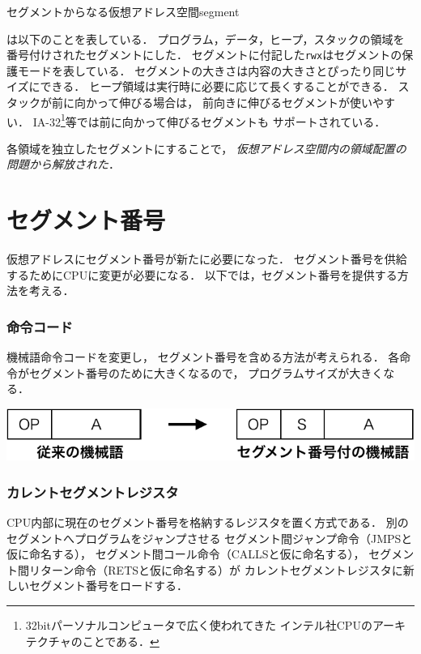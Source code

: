 {セグメントからなる仮想アドレス空間}{segment}

は以下のことを表している．
プログラム，データ，ヒープ，スタックの領域を番号付けされたセグメントにした．
セグメントに付記した\texttt{rwx}はセグメントの保護モードを表している．
セグメントの大きさは内容の大きさとぴったり同じサイズにできる．
ヒープ領域は実行時に必要に応じて長くすることができる．
スタックが前に向かって伸びる場合は，
前向きに伸びるセグメントが使いやすい．
IA-32\footnote{
32bitパーソナルコンピュータで広く使われてきた
インテル社CPUのアーキテクチャのことである．
}等では前に向かって伸びるセグメントも
サポートされている\cite{ia32Segmentation}．

各領域を独立したセグメントにすることで，
\emph{仮想アドレス空間内の領域配置の問題から解放された}．

\section{セグメント番号}
仮想アドレスにセグメント番号が新たに必要になった．
セグメント番号を供給するためにCPUに変更が必要になる．
以下では，セグメント番号を提供する方法を考える．

\subsubsection{命令コード}
機械語命令コードを変更し，
セグメント番号を含める方法が考えられる．
各命令がセグメント番号のために大きくなるので，
プログラムサイズが大きくなる．

\begin{center}
\includegraphics[scale=0.7]{Fig/segmentationInstruction-crop.pdf}
\end{center}
\subsubsection{カレントセグメントレジスタ}
CPU内部に現在のセグメント番号を格納するレジスタを置く方式である．
別のセグメントへプログラムをジャンプさせる
セグメント間ジャンプ命令（JMPSと仮に命名する），
セグメント間コール命令（CALLSと仮に命名する），
セグメント間リターン命令（RETSと仮に命名する）が
カレントセグメントレジスタに新しいセグメント番号をロードする．

